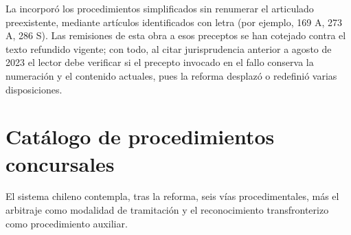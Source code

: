 \begin{alerta}
La \Lreforma{} incorporó los procedimientos simplificados sin renumerar el articulado
preexistente, mediante artículos identificados con letra (por ejemplo, 169 A, 273 A,
286 S). Las remisiones de esta obra a esos preceptos se han cotejado contra el texto refundido
vigente; con todo, al citar jurisprudencia anterior a agosto de 2023 el lector debe verificar si
el precepto invocado en el fallo conserva la numeración y el contenido actuales, pues la reforma
desplazó o redefinió varias disposiciones.
\end{alerta}

\section{Catálogo de procedimientos concursales}

El sistema chileno contempla, tras la reforma, seis vías procedimentales, más el
arbitraje como modalidad de tramitación y el reconocimiento transfronterizo como
procedimiento auxiliar.

